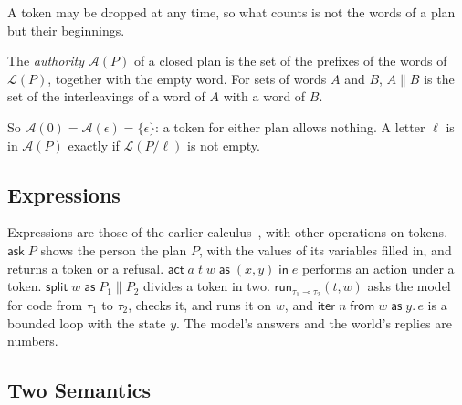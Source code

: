 \documentclass[acmsmall,nonacm,screen]{acmart}
\newcommand{\kw}[1]{\mathsf{#1}}
\newcommand{\ask}[1]{\kw{ask}\;#1}
\newcommand{\act}[5]{\kw{act}\;#1\;#2\;#3\;\kw{as}\;(#4)\;\kw{in}\;#5}
\newcommand{\splt}[3]{\kw{split}\;#1\;\kw{as}\;#2 \parallel #3}
\newcommand{\run}[4]{\kw{run}_{#1 \multimap #2}(#3, #4)}
\newcommand{\iter}[4]{\kw{iter}\;#1\;\kw{from}\;#2\;\kw{as}\;#3.\,#4}
\newcommand{\auth}[1]{\mathcal{A}(#1)}
\newcommand{\lang}[1]{\mathcal{L}(#1)}
\newcommand{\sh}{\mathbin{\parallel}}
\begin{document}
A token may be dropped at any time, so what counts is not the words of a plan but their
beginnings.

\begin{definition}[Authority]
\label{def:authority}
The \emph{authority} $\auth{P}$ of a closed plan is the set of the prefixes of the words of
$\lang{P}$, together with the empty word. For sets of words $A$ and $B$, $A \sh B$ is the
set of the interleavings of a word of $A$ with a word of $B$.
\end{definition}

So $\auth{0} = \auth{\epsilon} = \{\epsilon\}$: a token for either plan allows nothing. A
letter $\ell$ is in $\auth{P}$ exactly if $\lang{P / \ell}$ is not empty.

\subsection{Expressions}

Expressions are those of the earlier calculus~\citep{tpp4}, with other operations on tokens.
$\ask{P}$ shows the person the plan $P$, with the values of its variables filled in, and
returns a token or a refusal. $\act{a}{t}{w}{x, y}{e}$ performs an action under a token.
$\splt{w}{P_1}{P_2}$ divides a token in two. $\run{\tau_1}{\tau_2}{t}{w}$ asks the model for
code from $\tau_1$ to $\tau_2$, checks it, and runs it on $w$, and $\iter{n}{w}{y}{e}$ is a
bounded loop with the state $y$. The model's answers and the world's replies are numbers.

\subsection{Two Semantics}
\label{sec:semantics}
\end{document}
